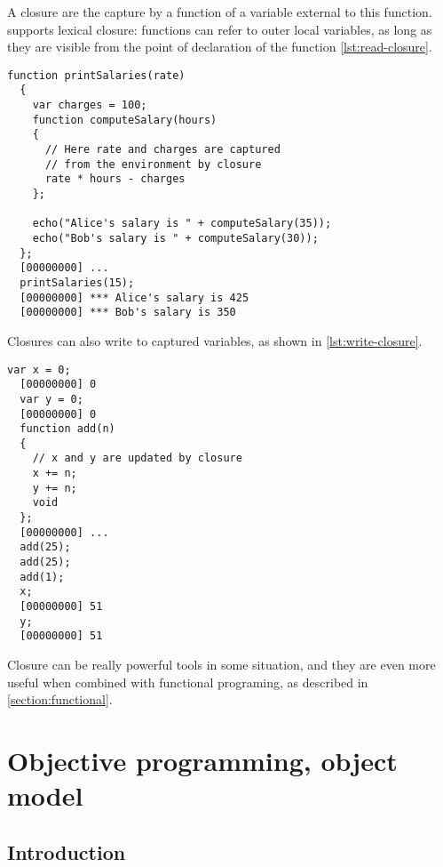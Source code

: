 \documentclass[openright,twoside,12pt]{report}
\newcommand{\lst}[1]{\autoref{lst:#1}}
\begin{document}
A closure are the capture by a function of a variable external to this
function. \urbi supports lexical closure: functions can refer to outer
local variables, as long as they are visible from the point of
declaration of the function \lst{read-closure}.

\begin{lstlisting}[caption=Capturing variables with lexical closures,
  label=lst:read-closure]
  function printSalaries(rate)
  {
    var charges = 100;
    function computeSalary(hours)
    {
      // Here rate and charges are captured
      // from the environment by closure
      rate * hours - charges
    };

    echo("Alice's salary is " + computeSalary(35));
    echo("Bob's salary is " + computeSalary(30));
  };
  [00000000] ...
  printSalaries(15);
  [00000000] *** Alice's salary is 425
  [00000000] *** Bob's salary is 350
\end{lstlisting}

Closures can also write to captured variables, as shown in
\lst{write-closure}.

\begin{lstlisting}[caption=Updating captured variables,
  label=lst:write-closure]
  var x = 0;
  [00000000] 0
  var y = 0;
  [00000000] 0
  function add(n)
  {
    // x and y are updated by closure
    x += n;
    y += n;
    void
  };
  [00000000] ...
  add(25);
  add(25);
  add(1);
  x;
  [00000000] 51
  y;
  [00000000] 51
\end{lstlisting}

Closure can be really powerful tools in some situation, and they are
even more useful when combined with functional programing, as
described in \autoref{section:functional}.


\chapter{Objective programming, \urbi object model}
\label{section:objective}


\section{Introduction}
\end{document}
